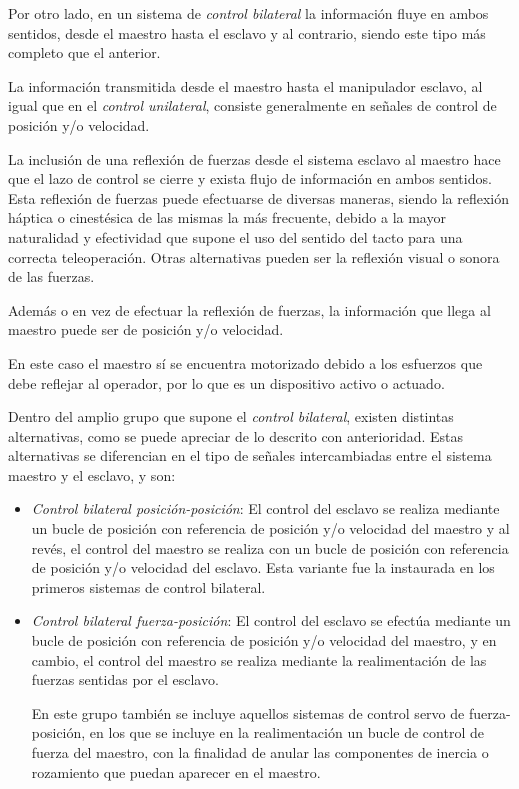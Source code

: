 Por otro lado, en un sistema de \emph{control bilateral} la información fluye en ambos sentidos, desde el maestro hasta el esclavo y al contrario, siendo este tipo más completo que el anterior. \par

La información transmitida desde el maestro hasta el manipulador esclavo, al igual que en el \emph{control unilateral}, consiste generalmente en señales de control de posición y/o velocidad. \par 

La inclusión de una reflexión de fuerzas desde el sistema esclavo al maestro hace que el lazo de control se cierre y exista flujo de información en ambos sentidos. Esta reflexión de fuerzas puede efectuarse de diversas maneras, siendo la reflexión háptica o cinestésica de las mismas la más frecuente, debido a la mayor naturalidad y efectividad que supone el uso del sentido del tacto para una correcta teleoperación. Otras alternativas pueden ser la reflexión visual o sonora de las fuerzas. \par 

Además o en vez de efectuar la reflexión de fuerzas, la información que llega al maestro puede ser de posición y/o velocidad. \par 

En este caso el maestro sí se encuentra motorizado debido a los esfuerzos que debe reflejar al operador, por lo que es un dispositivo activo o actuado. \par 

Dentro del amplio grupo que supone el \emph{control bilateral}, existen distintas alternativas, como se puede apreciar de lo descrito con anterioridad. Estas alternativas se diferencian en el tipo de señales intercambiadas entre el sistema maestro y el esclavo, y son: 

\begin{itemize}

\item \emph{Control bilateral posición-posición}: El control del esclavo se realiza mediante un bucle de posición con referencia de posición y/o velocidad del maestro y al revés, el control del maestro se realiza con un bucle de posición con referencia de posición y/o velocidad del esclavo. Esta variante fue la instaurada en los primeros sistemas de control bilateral. \par 

\item \emph{Control bilateral fuerza-posición}: El control del esclavo se efectúa mediante un bucle de posición con referencia de posición y/o velocidad del maestro, y en cambio, el control del maestro se realiza mediante la realimentación de las fuerzas sentidas por el esclavo. \par 

En este grupo también se incluye aquellos sistemas de control servo de fuerza-posición, en los que se incluye en la realimentación un bucle de control de fuerza del maestro, con la finalidad de anular las componentes de inercia o rozamiento que puedan aparecer en el maestro. \par 

\end{itemize}

